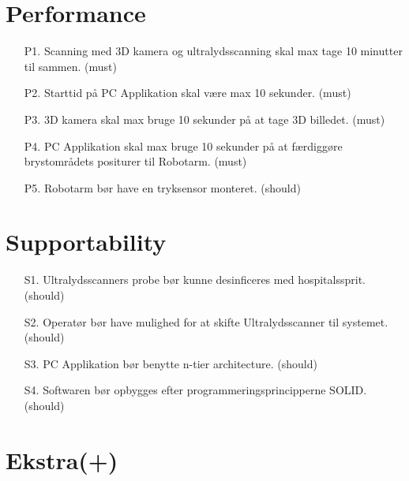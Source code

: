 \section{Performance}
\begin{enumerate}
    \item[P1.] Scanning med 3D kamera og ultralydsscanning skal max tage 10 minutter til sammen. (must) 
    \item[P2.] Starttid på PC Applikation skal være max 10 sekunder. (must)
    \item[P3.] 3D kamera skal max bruge 10 sekunder på at tage 3D billedet. (must)
    \item[P4.] PC Applikation skal max bruge 10 sekunder på at færdiggøre brystområdets positurer til Robotarm. (must)
    \item[P5.] Robotarm bør have en tryksensor monteret. (should)
\end{enumerate}

\section{Supportability}
\begin{enumerate}
    \item[S1.] Ultralydsscanners probe bør kunne desinficeres med hospitalssprit. (should)
    \item[S2.] Operatør bør have mulighed for at skifte Ultralydsscanner til systemet. (should)
    \item[S3.] PC Applikation bør benytte n-tier architecture. (should)
    \item[S4.] Softwaren bør opbygges efter programmeringsprincipperne SOLID. (should)
\end{enumerate}
\section{Ekstra(+)}\label{andrePlus}

